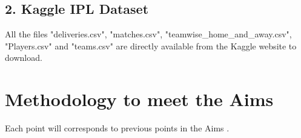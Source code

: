 \documentclass[12pt]{article}
\begin{document}
\newpage
	\subsection*{2. Kaggle IPL Dataset}
	All the files "deliveries.csv", "matches.csv", "teamwise\_home\_and\_away.csv", "Players.csv" and "teams.csv" are directly available from the Kaggle website to download.





\section*{Methodology to meet the Aims}
Each point will corresponds to previous points in the Aims .
\end{document}
